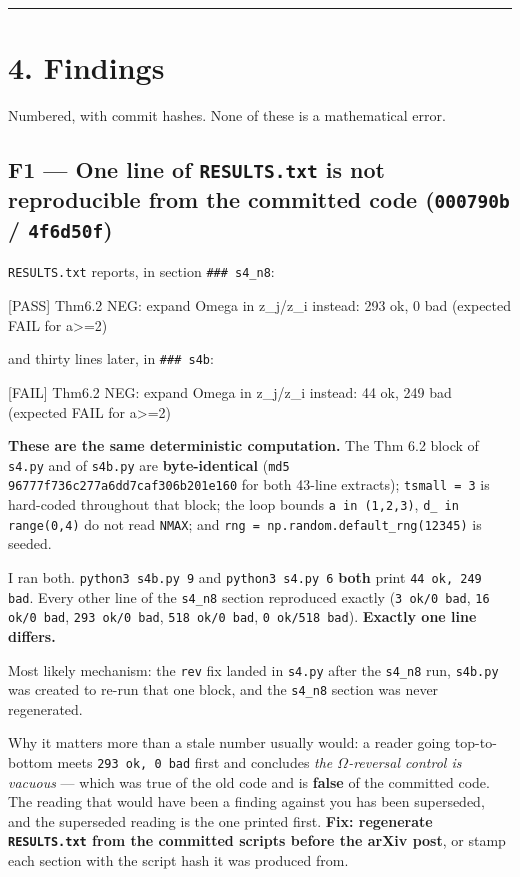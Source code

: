 \documentclass[11pt,a4paper]{article}
\begin{document}
\medskip\hrule\medskip

\section*{4. Findings}

Numbered, with commit hashes. None of these is a mathematical error.

\subsection*{F1 --- One line of \mbox{\texttt{RESULTS.txt}} is not reproducible from the committed code (\mbox{\texttt{000790b}} / \mbox{\texttt{4f6d50f}})}

\mbox{\texttt{RESULTS.txt}} reports, in section \mbox{\texttt{\#\#\# s4\_n8}}:

    [PASS] Thm6.2 NEG: expand Omega in z\_j/z\_i instead: 293 ok, 0 bad  (expected FAIL for a>=2)

and thirty lines later, in \mbox{\texttt{\#\#\# s4b}}:

    [FAIL] Thm6.2 NEG: expand Omega in z\_j/z\_i instead: 44 ok, 249 bad  (expected FAIL for a>=2)

\textbf{These are the same deterministic computation.} The Thm 6.2 block of \mbox{\texttt{s4.py}} and of \mbox{\texttt{s4b.py}} are \textbf{byte-identical} (\mbox{\texttt{md5 96777f736c277a6dd7caf306b201e160}} for both 43-line extracts); \mbox{\texttt{tsmall = 3}} is hard-coded throughout that block; the loop bounds \mbox{\texttt{a in (1,2,3)}}, \mbox{\texttt{d\_ in range(0,4)}} do not read \mbox{\texttt{NMAX}}; and \mbox{\texttt{rng = np.random.default\_rng(12345)}} is seeded.

I ran both. \mbox{\texttt{python3 s4b.py 9}} and \mbox{\texttt{python3 s4.py 6}} \textbf{both} print \mbox{\texttt{44 ok, 249 bad}}. Every other line of the \mbox{\texttt{s4\_n8}} section reproduced exactly (\mbox{\texttt{3 ok/0 bad}}, \mbox{\texttt{16 ok/0 bad}}, \mbox{\texttt{293 ok/0 bad}}, \mbox{\texttt{518 ok/0 bad}}, \mbox{\texttt{0 ok/518 bad}}). \textbf{Exactly one line differs.}

Most likely mechanism: the \mbox{\texttt{rev}} fix landed in \mbox{\texttt{s4.py}} after the \mbox{\texttt{s4\_n8}} run, \mbox{\texttt{s4b.py}} was created to re-run that one block, and the \mbox{\texttt{s4\_n8}} section was never regenerated.

Why it matters more than a stale number usually would: a reader going top-to-bottom meets \mbox{\texttt{293 ok, 0 bad}} first and concludes \emph{the $\Omega$-reversal control is vacuous} --- which was true of the old code and is \textbf{false} of the committed code. The reading that would have been a finding against you has been superseded, and the superseded reading is the one printed first. \textbf{Fix: regenerate \mbox{\texttt{RESULTS.txt}} from the committed scripts before the arXiv post}, or stamp each section with the script hash it was produced from.
\end{document}
